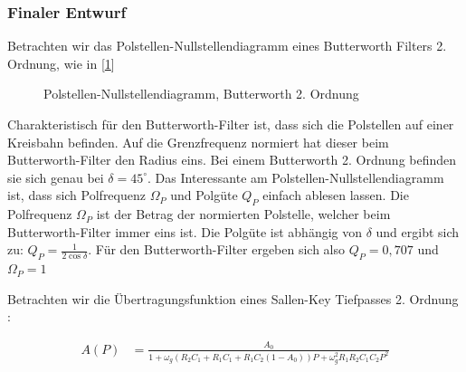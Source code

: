 \subsubsection{Finaler Entwurf}



Betrachten wir das Polstellen-Nullstellendiagramm eines Butterworth Filters 2. Ordnung, wie in [\cref{fig:filter_polnul}]


\begin{figure}[H]
\centering
{}
\caption{Polstellen-Nullstellendiagramm, Butterworth 2. Ordnung}
\label{fig:filter_polnul}
\end{figure}



Charakteristisch für den Butterworth-Filter ist, dass sich die Polstellen auf einer Kreisbahn befinden. Auf die Grenzfrequenz normiert hat dieser beim Butterworth-Filter den Radius
eins. Bei einem Butterworth 2. Ordnung befinden sie sich genau bei $\delta=45^\circ$. Das Interessante am Polstellen-Nullstellendiagramm ist, dass sich Polfrequenz $\Omega_P$ und 
Polgüte $Q_P$ einfach ablesen lassen. Die Polfrequenz $\Omega_P$ ist der Betrag der normierten Polstelle, welcher beim Butterworth-Filter immer eins ist.
Die Polgüte ist abhängig von $\delta$ und ergibt sich zu: $Q_P=\frac{1}{2\cos{\delta}}$. Für den Butterworth-Filter ergeben sich also $Q_P=0,707$ und $\Omega_P=1$

Betrachten wir die Übertragungsfunktion eines Sallen-Key Tiefpasses 2. Ordnung \cite[S. 101]{Krucker2000}:

\begin{align*}
A(P)&=\frac{A_0}{1+\omega_g (R_2 C_1 + R_1 C_1 + R_1 C_2(1-A_0))P + \omega_g^2R_1 R_2 C_1C_2P^2}
\end{align*}

